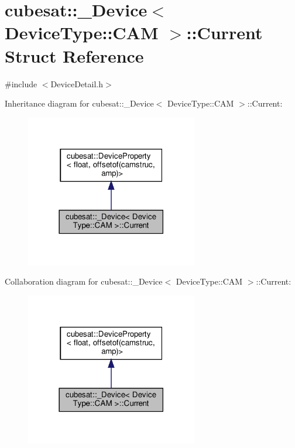 \hypertarget{structcubesat_1_1__Device_3_01DeviceType_1_1CAM_01_4_1_1Current}{}\section{cubesat\+:\+:\+\_\+\+Device$<$ Device\+Type\+:\+:C\+AM $>$\+:\+:Current Struct Reference}
\label{structcubesat_1_1__Device_3_01DeviceType_1_1CAM_01_4_1_1Current}


{\ttfamily \#include $<$Device\+Detail.\+h$>$}



Inheritance diagram for cubesat\+:\+:\+\_\+\+Device$<$ Device\+Type\+:\+:C\+AM $>$\+:\+:Current\+:\nopagebreak
\begin{figure}[H]
\begin{center}
\leavevmode
\includegraphics[width=213pt]{structcubesat_1_1__Device_3_01DeviceType_1_1CAM_01_4_1_1Current__inherit__graph}
\end{center}
\end{figure}


Collaboration diagram for cubesat\+:\+:\+\_\+\+Device$<$ Device\+Type\+:\+:C\+AM $>$\+:\+:Current\+:\nopagebreak
\begin{figure}[H]
\begin{center}
\leavevmode
\includegraphics[width=213pt]{structcubesat_1_1__Device_3_01DeviceType_1_1CAM_01_4_1_1Current__coll__graph}
\end{center}
\end{figure}
